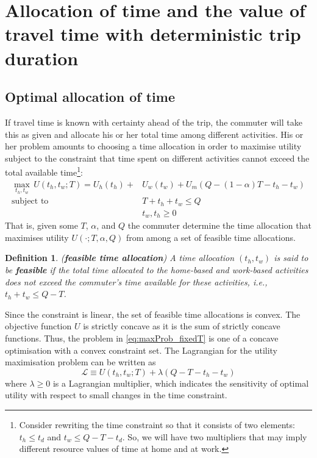 \documentclass[12pt,a4paper,british]{article}
\newtheorem{definition}{Definition}[section]
\begin{document}
\section{Allocation of time and the value of travel time with deterministic trip duration}

\subsection*{Optimal allocation of time}

If travel time is known with certainty ahead of the trip, the commuter will take this as given and allocate his or her total time among different activities. His or her problem amounts to choosing a time allocation in order to maximise utility subject to the constraint that time spent on different activities cannot exceed the total available time\footnote{Consider rewriting the time constraint so that it consists of two elements: $t_h \leq t_d$ and $t_w \leq Q-T-t_d$. So, we will have two multipliers that may imply different resource values of time at home and at work.}:
\begin{equation}
\begin{aligned}
    \max_{t_{h},t_{w}} \, U\left(t_{h},t_{w};T\right) = U_{h} \left(t_{h}\right) + & U_{w}\left(t_{w}\right) + U_{m}\left( Q - \left(1-\alpha\right) T - t_{h} - t_{w} \right) \\
    \mbox{subject to} \quad & T + t_{h} + t_{w} \leq Q \\
                      \quad & t_w, t_h \geq 0 
\end{aligned}
\label{eq:maxProb_fixedT}
\end{equation}
That is, given some $T$, $\alpha$, and $Q$ the commuter determine the time allocation that maximises utility $U\left( \cdot; T, \alpha, Q \right)$ from among a set of feasible time allocations. 

\begin{definition}
(\textbf{feasible time allocation}) A time allocation $\left( t_h, t_w \right)$ is said to be \textbf{\textit{feasible}} if the total time allocated to the home-based and work-based activities does not exceed the commuter's time available for these activities, i.e., $t_h + t_w \leq Q - T$. 
\end{definition}

Since the constraint is linear, the set of feasible time allocations is convex. The objective function $U$ is strictly concave as it is the sum of strictly concave functions. Thus, the problem in \eqref{eq:maxProb_fixedT} is one of a concave optimisation with a convex constraint set. The Lagrangian for the utility maximisation problem can be written as
\begin{equation*}
\mathcal{L} \equiv U\left(t_{h},t_{w};T\right) + \lambda \left(Q - T - t_{h} - t_{w}\right)
\end{equation*}%
where $\lambda\geq0$ is a Lagrangian multiplier, which indicates the sensitivity of optimal utility with respect to small changes in the time constraint. 
\end{document}
